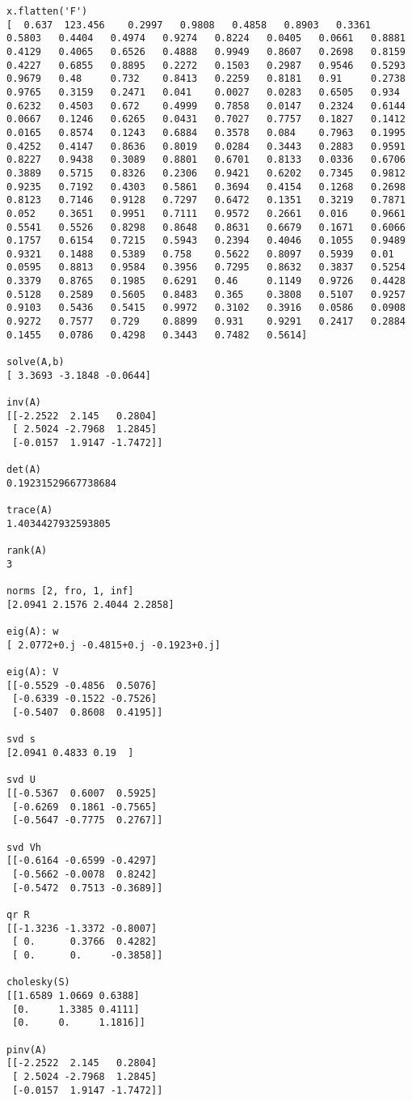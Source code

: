 \begin{verbatim}
x.flatten('F')
[  0.637  123.456    0.2997   0.9808   0.4858   0.8903   0.3361   0.5803   0.4404   0.4974   0.9274   0.8224   0.0405   0.0661   0.8881   0.4129   0.4065   0.6526   0.4888   0.9949   0.8607   0.2698   0.8159   0.4227   0.6855   0.8895   0.2272   0.1503   0.2987   0.9546   0.5293   0.9679   0.48     0.732    0.8413   0.2259   0.8181   0.91     0.2738   0.9765   0.3159   0.2471   0.041    0.0027   0.0283   0.6505   0.934    0.6232   0.4503   0.672    0.4999   0.7858   0.0147   0.2324   0.6144   0.0667   0.1246   0.6265   0.0431   0.7027   0.7757   0.1827   0.1412   0.0165   0.8574   0.1243   0.6884   0.3578   0.084    0.7963   0.1995   0.4252   0.4147   0.8636   0.8019   0.0284   0.3443   0.2883   0.9591   0.8227   0.9438   0.3089   0.8801   0.6701   0.8133   0.0336   0.6706   0.3889   0.5715   0.8326   0.2306   0.9421   0.6202   0.7345   0.9812   0.9235   0.7192   0.4303   0.5861   0.3694   0.4154   0.1268   0.2698   0.8123   0.7146   0.9128   0.7297   0.6472   0.1351   0.3219   0.7871   0.052    0.3651   0.9951   0.7111   0.9572   0.2661   0.016    0.9661   0.5541   0.5526   0.8298   0.8648   0.8631   0.6679   0.1671   0.6066   0.1757   0.6154   0.7215   0.5943   0.2394   0.4046   0.1055   0.9489   0.9321   0.1488   0.5389   0.758    0.5622   0.8097   0.5939   0.01     0.0595   0.8813   0.9584   0.3956   0.7295   0.8632   0.3837   0.5254   0.3379   0.8765   0.1985   0.6291   0.46     0.1149   0.9726   0.4428   0.5128   0.2589   0.5605   0.8483   0.365    0.3808   0.5107   0.9257   0.9103   0.5436   0.5415   0.9972   0.3102   0.3916   0.0586   0.0908   0.9272   0.7577   0.729    0.8899   0.931    0.9291   0.2417   0.2884   0.1455   0.0786   0.4298   0.3443   0.7482   0.5614]

solve(A,b)
[ 3.3693 -3.1848 -0.0644]

inv(A)
[[-2.2522  2.145   0.2804]
 [ 2.5024 -2.7968  1.2845]
 [-0.0157  1.9147 -1.7472]]

det(A)
0.19231529667738684

trace(A)
1.4034427932593805

rank(A)
3

norms [2, fro, 1, inf]
[2.0941 2.1576 2.4044 2.2858]

eig(A): w
[ 2.0772+0.j -0.4815+0.j -0.1923+0.j]

eig(A): V
[[-0.5529 -0.4856  0.5076]
 [-0.6339 -0.1522 -0.7526]
 [-0.5407  0.8608  0.4195]]

svd s
[2.0941 0.4833 0.19  ]

svd U
[[-0.5367  0.6007  0.5925]
 [-0.6269  0.1861 -0.7565]
 [-0.5647 -0.7775  0.2767]]

svd Vh
[[-0.6164 -0.6599 -0.4297]
 [-0.5662 -0.0078  0.8242]
 [-0.5472  0.7513 -0.3689]]

qr R
[[-1.3236 -1.3372 -0.8007]
 [ 0.      0.3766  0.4282]
 [ 0.      0.     -0.3858]]

cholesky(S)
[[1.6589 1.0669 0.6388]
 [0.     1.3385 0.4111]
 [0.     0.     1.1816]]

pinv(A)
[[-2.2522  2.145   0.2804]
 [ 2.5024 -2.7968  1.2845]
 [-0.0157  1.9147 -1.7472]]

\end{verbatim}
